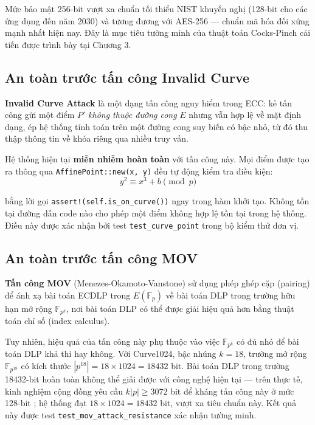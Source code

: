 Mức bảo mật 256-bit vượt xa chuẩn tối thiểu NIST khuyến nghị (128-bit
cho các ứng dụng đến năm 2030) và tương đương với AES-256 --- chuẩn mã
hóa đối xứng mạnh nhất hiện nay. Đây là mục tiêu tường minh của thuật
toán Cocks-Pinch cải tiến được trình bày tại Chương 3.

\subsection{An toàn trước tấn công Invalid
Curve}\label{an-touxe0n-trux1b0ux1edbc-tux1ea5n-cuxf4ng-invalid-curve}

\textbf{Invalid Curve Attack} là một dạng tấn công nguy hiểm trong ECC:
kẻ tấn công gửi một điểm \(P'\) \emph{không thuộc đường cong} \(E\)
nhưng vẫn hợp lệ về mặt định dạng, ép hệ thống tính toán trên một đường
cong suy biến có bậc nhỏ, từ đó thu thập thông tin về khóa riêng qua
nhiều truy vấn.

Hệ thống hiện tại \textbf{miễn nhiễm hoàn toàn} với tấn công này. Mọi
điểm được tạo ra thông qua \texttt{AffinePoint::new(x,\ y)} đều tự động
kiểm tra điều kiện: \[y^2 \equiv x^3 + b \pmod{p}\]

bằng lời gọi \texttt{assert!(self.is\_on\_curve())} ngay trong hàm khởi
tạo. Không tồn tại đường dẫn code nào cho phép một điểm không hợp lệ tồn
tại trong hệ thống. Điều này được xác nhận bởi test
\texttt{test\_curve\_point} trong bộ kiểm thử đơn vị.

\subsection{An toàn trước tấn công
MOV}\label{an-touxe0n-trux1b0ux1edbc-tux1ea5n-cuxf4ng-mov}

\textbf{Tấn công MOV} (Menezes-Okamoto-Vanstone) \citep{MOV1993} sử dụng
phép ghép cặp (pairing) để ánh xạ bài toán ECDLP trong
\(E(\mathbb{F}_p)\) về bài toán DLP trong trường hữu hạn mở rộng
\(\mathbb{F}_{p^k}\), nơi bài toán DLP có thể được giải hiệu quả hơn
bằng thuật toán chỉ số (index calculus).

Tuy nhiên, hiệu quả của tấn công này phụ thuộc vào việc
\(\mathbb{F}_{p^k}\) có đủ nhỏ để bài toán DLP khả thi hay không. Với
Curve1024, bậc nhúng \(k = 18\), trường mở rộng \(\mathbb{F}_{p^{18}}\)
có kích thước \(|p^{18}| = 18 \times 1024 = 18432\) bit. Bài toán DLP
trong trường 18432-bit hoàn toàn không thể giải được với công nghệ hiện
tại --- trên thực tế, kinh nghiệm cộng đồng yêu cầu \(k|p| \geq 3072\)
bit để kháng tấn công này ở mức 128-bit \citep{BarbulescuDuquesne2019};
hệ thống đạt \(18 \times 1024 = 18432\) bit, vượt xa tiêu chuẩn này. Kết
quả này được test \texttt{test\_mov\_attack\_resistance} xác nhận tường
minh.

